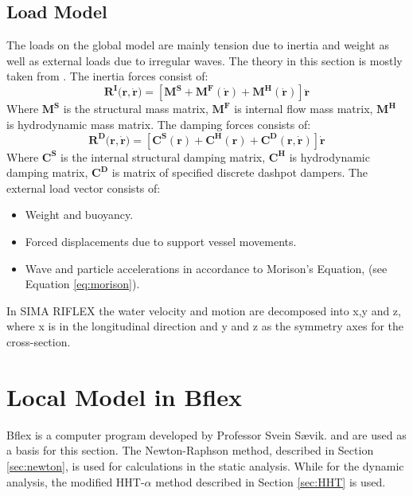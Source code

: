 \subsection{Load Model}
The loads on the global model are mainly tension due to inertia and weight as well as external loads due to irregular waves. The theory in this section is mostly taken from \cite{sintef2017}.\newline
\newline
\noindent The inertia forces consist of:
\begin{equation}
    \boldsymbol{R^I(r,\dot{r}})= [\boldsymbol{M^S} + \boldsymbol{M^F(\dot{r})} + \boldsymbol{M^H (\dot{r})} ]\boldsymbol{\ddot{r}}
\end{equation}
Where $\boldsymbol{M^S}$ is the structural mass matrix, $\boldsymbol{M^F}$ is internal flow mass matrix, $\boldsymbol{M^H}$ is hydrodynamic mass matrix. 
\newline
\newline
\noindent The damping forces consists of:
\begin{equation}
    \boldsymbol{R^D(r,\dot{r}})= [\boldsymbol{C^S(r)} + \boldsymbol{C^H(r)} + \boldsymbol{C^D (r,\dot{r})} ]\boldsymbol{\dot{r}}
\end{equation}
Where $\boldsymbol{C^S}$ is the  internal structural damping matrix, $\boldsymbol{C^H}$ is hydrodynamic damping matrix, $\boldsymbol{C^D}$ is matrix of specified discrete dashpot dampers. \newline
\newline
\noindent The external load vector consists of:
\begin{itemize}
\item Weight and buoyancy.
\item Forced displacements due to support vessel movements.
\item Wave and particle accelerations in accordance to Morison's Equation, (see Equation \ref{eq:morison}).
\end{itemize}
In SIMA RIFLEX the water velocity and motion are decomposed into x,y and z, where x is in the longitudinal direction and y and z as the symmetry axes for the cross-section.

\section{Local Model in Bflex }
Bflex is a computer program developed by Professor Svein Sævik. \cite{Bflextheory2013}  and \cite{Bflextheory2017} are used as a basis for this section.  The Newton-Raphson method, described in Section \ref{sec:newton}, is used for calculations in the static analysis. While for the dynamic analysis, the modified HHT-$\alpha$ method described in Section \ref{sec:HHT} is used.

